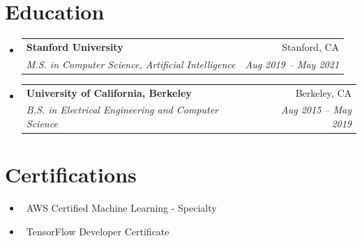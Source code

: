 \documentclass[letterpaper,10pt]{article}
\makeatletter
\newcommand{\resumeItem}[1]{\item\small{#1}}
\newcommand{\resumeSubheading}[4]{
\vspace{-1pt}\item
  \begin{tabular*}{0.97\textwidth}[t]{l@{\extracolsep{\fill}}r}
    \textbf{#1} & #2 \\
    \textit{#3} & \textit{#4} \\
  \end{tabular*}\vspace{-7pt}
}
\newcommand{\resumeSubHeadingList}{\begin{itemize}[leftmargin=0.15in, label={}]}
\newcommand{\resumeSubHeadingListEnd}{\end{itemize}}
\makeatother
\begin{document}
\section{Education}
\resumeSubHeadingList
  \resumeSubheading
      {Stanford University}{Stanford, CA}
      {M.S. in Computer Science, Artificial Intelligence}{Aug 2019 -- May 2021}
  \resumeSubheading
      {University of California, Berkeley}{Berkeley, CA}
      {B.S. in Electrical Engineering and Computer Science}{Aug 2015 -- May 2019}
\resumeSubHeadingListEnd

\section{Certifications}
\resumeSubHeadingList
  \resumeItem{\textbullet\ AWS Certified Machine Learning - Specialty}
  \resumeItem{\textbullet\ TensorFlow Developer Certificate}
\resumeSubHeadingListEnd
\end{document}
